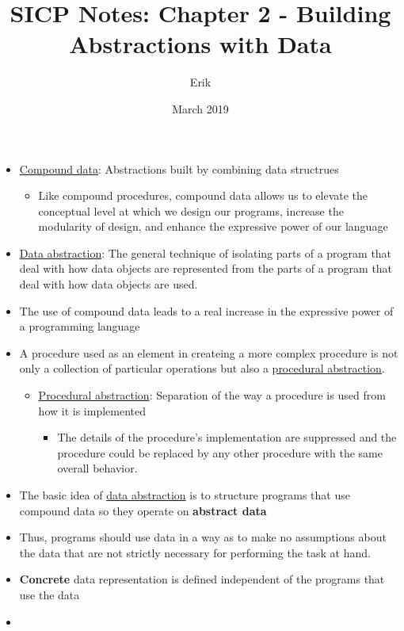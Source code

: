 \documentclass{article}
\title{SICP Notes: Chapter 2 - Building Abstractions with Data}
\author{Erik}
\date{March 2019}
\begin{document}
\begin{titlepage}
  \maketitle
\end{titlepage}

\begin{itemize}
\item  \underline{Compound data}: Abstractions built by combining data structrues
  \begin{itemize}
  \item Like compound procedures, compound data allows us to elevate the conceptual level at which we design our programs, increase the modularity of design, and enhance the expressive power of our language
  \end{itemize}
\item \underline{Data abstraction}: The general technique of isolating parts of a program that deal with how data objects are represented from the parts of a program that deal with how data objects are used.
\item The use of compound data leads to a real increase in the expressive power of a programming language
\item A procedure used as an element in createing a more complex procedure is not only a collection of particular operations but also a \underline{procedural abstraction}.
  \begin{itemize}
  \item \underline{Procedural abstraction}: Separation of the way a procedure is used from how it is implemented
    \begin{itemize}
    \item The details of the procedure's implementation are suppressed and the procedure could be replaced by any other procedure with the same overall behavior.
    \end{itemize}
  \end{itemize}
\item The basic idea of \underline{data abstraction} is to structure programs that use compound data so they operate on  \textbf{abstract data}
\item Thus, programs should use data in a way as to make no assumptions about the data that are not strictly necessary for performing the task at hand.
\item \textbf{Concrete} data representation is defined independent of the programs that use the data
\item \noindent\fbox{%
}
\end{itemize}
\end{document}
